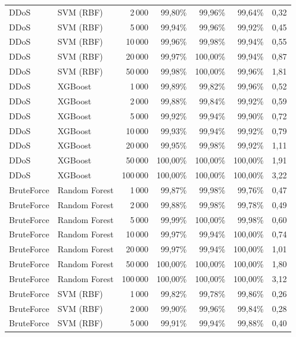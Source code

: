 {\begin{tabular}{@{}llrrrrr@{}}
DDoS & SVM (RBF) & 2\,000 & 99,80\% & 99,96\% & 99,64\% & 0,32\\
\rowcolor{rowalt}DDoS & SVM (RBF) & 5\,000 & 99,94\% & 99,96\% & 99,92\% & 0,45\\
DDoS & SVM (RBF) & 10\,000 & 99,96\% & 99,98\% & 99,94\% & 0,55\\
\rowcolor{rowalt}DDoS & SVM (RBF) & 20\,000 & 99,97\% & 100,00\% & 99,94\% & 0,87\\
DDoS & SVM (RBF) & 50\,000 & 99,98\% & 100,00\% & 99,96\% & 1,81\\
\rowcolor{rowalt}DDoS & XGBoost & 1\,000 & 99,89\% & 99,82\% & 99,96\% & 0,52\\
DDoS & XGBoost & 2\,000 & 99,88\% & 99,84\% & 99,92\% & 0,59\\
\rowcolor{rowalt}DDoS & XGBoost & 5\,000 & 99,92\% & 99,94\% & 99,90\% & 0,72\\
DDoS & XGBoost & 10\,000 & 99,93\% & 99,94\% & 99,92\% & 0,79\\
\rowcolor{rowalt}DDoS & XGBoost & 20\,000 & 99,95\% & 99,98\% & 99,92\% & 1,11\\
DDoS & XGBoost & 50\,000 & 100,00\% & 100,00\% & 100,00\% & 1,91\\
\rowcolor{rowalt}DDoS & XGBoost & 100\,000 & 100,00\% & 100,00\% & 100,00\% & 3,22\\
BruteForce & Random Forest & 1\,000 & 99,87\% & 99,98\% & 99,76\% & 0,47\\
\rowcolor{rowalt}BruteForce & Random Forest & 2\,000 & 99,88\% & 99,98\% & 99,78\% & 0,49\\
BruteForce & Random Forest & 5\,000 & 99,99\% & 100,00\% & 99,98\% & 0,60\\
\rowcolor{rowalt}BruteForce & Random Forest & 10\,000 & 99,97\% & 99,94\% & 100,00\% & 0,74\\
BruteForce & Random Forest & 20\,000 & 99,97\% & 99,94\% & 100,00\% & 1,01\\
\rowcolor{rowalt}BruteForce & Random Forest & 50\,000 & 100,00\% & 100,00\% & 100,00\% & 1,80\\
BruteForce & Random Forest & 100\,000 & 100,00\% & 100,00\% & 100,00\% & 3,12\\
\rowcolor{rowalt}BruteForce & SVM (RBF) & 1\,000 & 99,82\% & 99,78\% & 99,86\% & 0,26\\
BruteForce & SVM (RBF) & 2\,000 & 99,90\% & 99,96\% & 99,84\% & 0,28\\
\rowcolor{rowalt}BruteForce & SVM (RBF) & 5\,000 & 99,91\% & 99,94\% & 99,88\% & 0,40\\

\end{tabular}}
